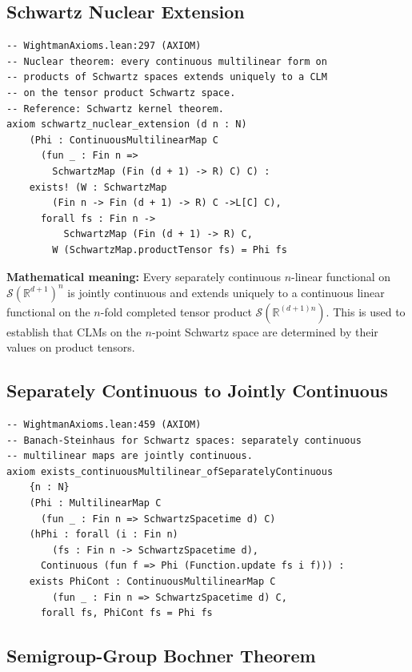 \documentclass[11pt,a4paper]{article}
\newcommand{\Schwartz}{\mathscr{S}}
\begin{document}
\subsection{Schwartz Nuclear Extension}

\begin{lstlisting}[style=leanaxiom]
-- WightmanAxioms.lean:297 (AXIOM)
-- Nuclear theorem: every continuous multilinear form on
-- products of Schwartz spaces extends uniquely to a CLM
-- on the tensor product Schwartz space.
-- Reference: Schwartz kernel theorem.
axiom schwartz_nuclear_extension (d n : N)
    (Phi : ContinuousMultilinearMap C
      (fun _ : Fin n =>
        SchwartzMap (Fin (d + 1) -> R) C) C) :
    exists! (W : SchwartzMap
        (Fin n -> Fin (d + 1) -> R) C ->L[C] C),
      forall fs : Fin n ->
          SchwartzMap (Fin (d + 1) -> R) C,
        W (SchwartzMap.productTensor fs) = Phi fs
\end{lstlisting}

\noindent\textbf{Mathematical meaning:} Every separately continuous
$n$-linear functional on $\Schwartz(\mathbb{R}^{d+1})^n$ is jointly
continuous and extends uniquely to a continuous linear functional on the
$n$-fold completed tensor product $\Schwartz(\mathbb{R}^{(d+1)n})$.
This is used to establish that CLMs on the $n$-point Schwartz space
are determined by their values on product tensors.

\subsection{Separately Continuous to Jointly Continuous}

\begin{lstlisting}[style=leanaxiom]
-- WightmanAxioms.lean:459 (AXIOM)
-- Banach-Steinhaus for Schwartz spaces: separately continuous
-- multilinear maps are jointly continuous.
axiom exists_continuousMultilinear_ofSeparatelyContinuous
    {n : N}
    (Phi : MultilinearMap C
      (fun _ : Fin n => SchwartzSpacetime d) C)
    (hPhi : forall (i : Fin n)
        (fs : Fin n -> SchwartzSpacetime d),
      Continuous (fun f => Phi (Function.update fs i f))) :
    exists PhiCont : ContinuousMultilinearMap C
        (fun _ : Fin n => SchwartzSpacetime d) C,
      forall fs, PhiCont fs = Phi fs
\end{lstlisting}

\subsection{Semigroup-Group Bochner Theorem}
\end{document}
